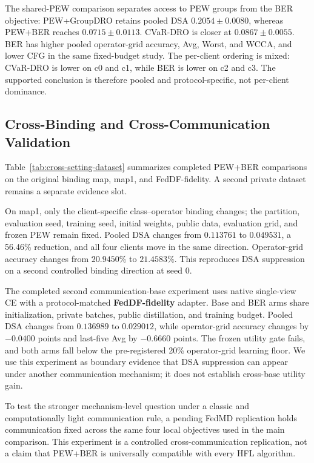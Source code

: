 The shared-PEW comparison separates access to PEW groups from the BER objective: PEW+GroupDRO retains pooled DSA \(0.2054\pm0.0080\), whereas PEW+BER reaches \(0.0715\pm0.0113\). CVaR-DRO is closer at \(0.0867\pm0.0055\). BER has higher pooled operator-grid accuracy, Avg, Worst, and WCCA, and lower CFG in the same fixed-budget study. The per-client ordering is mixed: CVaR-DRO is lower on c0 and c1, while BER is lower on c2 and c3. The supported conclusion is therefore pooled and protocol-specific, not per-client dominance.

\ifdraftskeleton
{}
\fi

\subsection{Cross-Binding and Cross-Communication Validation}

Table~\ref{tab:cross-setting-dataset} summarizes completed PEW+BER comparisons on the original binding map, map1, and FedDF-fidelity. A second private dataset remains a separate evidence slot.



On map1, only the client-specific class--operator binding changes; the partition, evaluation seed, training seed, initial weights, public data, evaluation grid, and frozen PEW remain fixed. Pooled DSA changes from \(0.113761\) to \(0.049531\), a 56.46\% reduction, and all four clients move in the same direction. Operator-grid accuracy changes from \(20.9450\%\) to \(21.4583\%\). This reproduces DSA suppression on a second controlled binding direction at seed 0.

The completed second communication-base experiment uses native single-view CE with a protocol-matched \textbf{FedDF-fidelity} adapter. Base and BER arms share initialization, private batches, public distillation, and training budget. Pooled DSA changes from \(0.136989\) to \(0.029012\), while operator-grid accuracy changes by \(-0.0400\) points and last-five Avg by \(-0.6660\) points. The frozen utility gate fails, and both arms fall below the pre-registered 20\% operator-grid learning floor. We use this experiment as boundary evidence that DSA suppression can appear under another communication mechanism; it does not establish cross-base utility gain.

To test the stronger mechanism-level question under a classic and computationally light communication rule, a pending FedMD replication holds communication fixed across the same four local objectives used in the main comparison. This experiment is a controlled cross-communication replication, not a claim that PEW+BER is universally compatible with every HFL algorithm.

